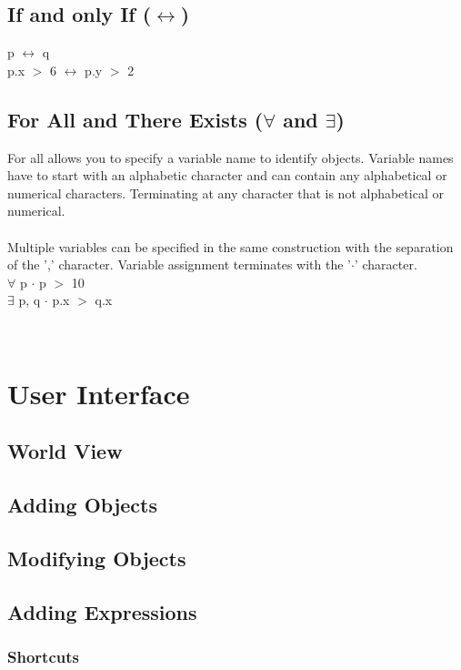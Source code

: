 \documentclass{article}
\begin{document}
	\subsection{If and only If ($\leftrightarrow$)}
	p $\leftrightarrow$ q \\
	p.x $>$ 6 $\leftrightarrow$ p.y $>$ 2
	
	\subsection{For All and There Exists ($\forall$ and $\exists$)}
	For all allows you to specify a variable name to identify objects. Variable names have to start with an alphabetic character and can contain any alphabetical or numerical characters. Terminating at any character that is not alphabetical or numerical.\\ \\
	Multiple variables can be specified in the same construction with the separation of the ',' character. Variable assignment terminates with the '$\cdot$' character. \\
	$\forall$ p $\cdot$ p $>$ 10 \\
	$\exists$ p, q $\cdot$ p.x $>$ q.x
		
	\phantom
	\\	
	\section{User Interface}
	
	\subsection{World View}
	
	\subsection{Adding Objects}
	
	\subsection{Modifying Objects}
	
	\subsection{Adding Expressions}
	
	\subsubsection{Shortcuts}
	
\end{document}
